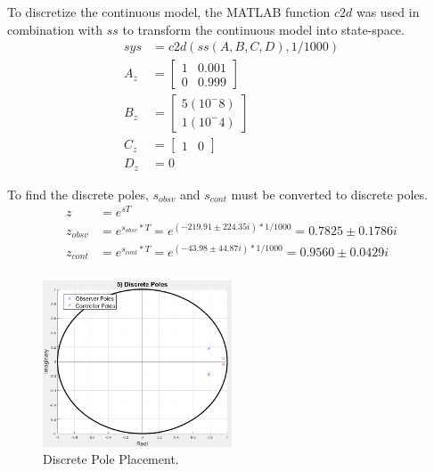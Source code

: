 \documentclass[11pt]{article}
\begin{document}
\begin{enumerate}[label=\textbf{\arabic*.}]
  To discretize the continuous model, the MATLAB function $c2d$ was used in 
  combination with $ss$ to transform the continuous model into state-space.
  \begin{equation}
    \begin{split}
      sys &= c2d(ss(A,B,C,D), 1/1000) \\
      A_z &= 
      \begin{bmatrix}
        1 & 0.001 \\ 0 & 0.999
      \end{bmatrix} \\
      B_z &= 
      \begin{bmatrix}
        5(10^-8) \\ 1(10^-4)
      \end{bmatrix} \\
      C_z &=
      \begin{bmatrix}
        1 & 0
      \end{bmatrix} \\
      D_z &= 0
    \end{split}
  \end{equation}

  To find the discrete poles, $s_{obsv}$ and $s_{cont}$ must be converted to 
  discrete poles.
  \begin{equation}
    \begin{split}
      z &= e^{sT} \\ 
      z_{obsv} &= e^{s_{obsv}*T} = e^{(-219.91 \pm 224.35i)*1/1000}
      = 0.7825 \pm 0.1786i \\
      z_{cont} &= e^{s_{cont}*T} = e^{(-43.98 \pm 44.87i)*1/1000}
      = 0.9560 \pm 0.0429i \\
    \end{split}
  \end{equation}
  \begin{figure}[H]
    \centering
    \includegraphics[width=0.5\textwidth]{p5.png}
    \caption{Discrete Pole Placement.}
  \end{figure}


\end{enumerate}
\end{document}
